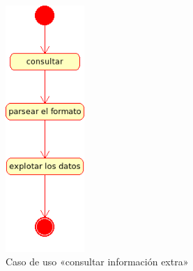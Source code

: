 \begin{figure}[ht]
 	\centering
	\includegraphics[width=3cm]{images/uml/casos-uso/consultar-extra.png}
	\caption{Caso de uso «consultar información extra»}
	\label{fig:uml:consultar-extra}
\end{figure}

